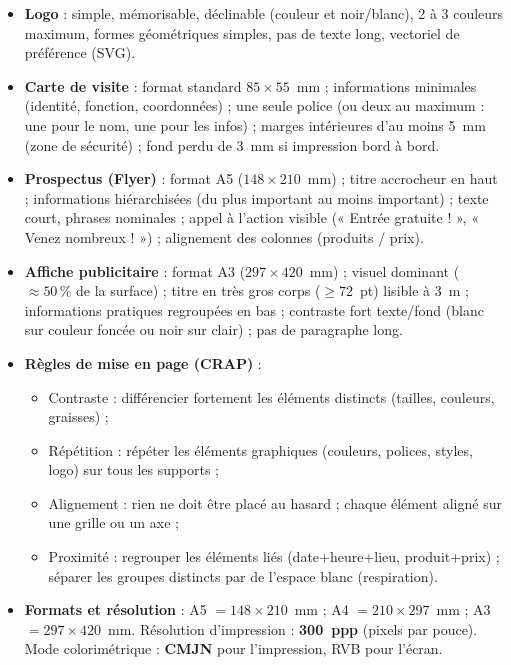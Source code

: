 \documentclass[11pt]{article}
\newcommand{\cle}[1]{{\popxbold\color{popdark}#1}}
\begin{document}
\begin{aretenir}
\begin{itemize}
  \item \textbf{Logo} : simple, mémorisable, déclinable (couleur et noir/blanc), 2 à 3 couleurs maximum, formes géométriques simples, pas de texte long, vectoriel de préférence (SVG).
  \item \textbf{Carte de visite} : format standard $85 \times 55$~mm ; informations minimales (identité, fonction, coordonnées) ; une seule police (ou deux au maximum : une pour le nom, une pour les infos) ; marges intérieures d'au moins 5~mm (zone de sécurité) ; fond perdu de 3~mm si impression bord à bord.
  \item \textbf{Prospectus (Flyer)} : format A5 ($148 \times 210$~mm) ; titre accrocheur en haut ; informations hiérarchisées (du plus important au moins important) ; texte court, phrases nominales ; \cle{appel à l'action} visible (« Entrée gratuite ! », « Venez nombreux ! ») ; alignement des colonnes (produits / prix).
  \item \textbf{Affiche publicitaire} : format A3 ($297 \times 420$~mm) ; \cle{visuel dominant} ($\approx 50\,\%$ de la surface) ; titre en très gros corps ($\ge 72$~pt) lisible à 3~m ; informations pratiques regroupées en bas ; contraste fort texte/fond (blanc sur couleur foncée ou noir sur clair) ; pas de paragraphe long.
  \item \textbf{Règles de mise en page (CRAP)} :
        \begin{itemize}
          \item \cle{Contraste} : différencier fortement les éléments distincts (tailles, couleurs, graisses) ;
          \item \cle{Répétition} : répéter les éléments graphiques (couleurs, polices, styles, logo) sur tous les supports ;
          \item \cle{Alignement} : rien ne doit être placé au hasard ; chaque élément aligné sur une grille ou un axe ;
          \item \cle{Proximité} : regrouper les éléments liés (date+heure+lieu, produit+prix) ; séparer les groupes distincts par de l'espace blanc (\cle{respiration}).
        \end{itemize}
  \item \textbf{Formats et résolution} : A5 $= 148 \times 210$~mm ; A4 $= 210 \times 297$~mm ; A3 $= 297 \times 420$~mm. Résolution d'impression : \textbf{300~ppp} (pixels par pouce). Mode colorimétrique : \textbf{CMJN} pour l'impression, RVB pour l'écran.
\end{itemize}
\end{aretenir}
\end{document}

